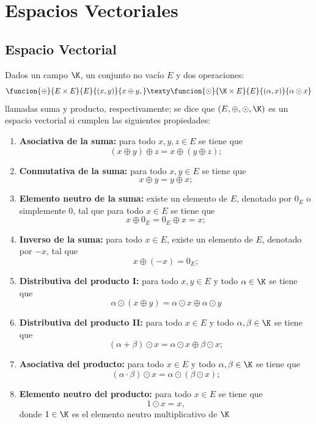 \documentclass[compacto,10pt]{pubciencias-notas}
\begin{document}
\encabezado

\section{Espacios Vectoriales}
\subsection{Espacio Vectorial}

\begin{defi}
    Dados un campo $\K$, un conjunto no vacío $E$ y dos operaciones:
    \[
        \funcion{\oplus}{E\times E}{E}{(x,y)}{x\oplus y,}
        \texty
        \funcion{\odot}{\K\times E}{E}{(\alpha,x)}{\alpha\odot x}
    \]
    llamadas suma y producto, respectivamente; se dice que $(E,\oplus,\odot,\K)$ es un espacio vectorial si cumplen las siguientes propiedades:
    \begin{enumerate}
    \item \textbf{Asociativa de la suma:}
        para todo $x,y,z\in E$ se tiene que
        \[
            (x \oplus y) \oplus z = x \oplus (y \oplus z);
        \]
    \item \textbf{Conmutativa de la suma:}
        para todo $x,y\in E$ se tiene que
        \[
            x \oplus y = y \oplus x;
        \]
    \item \textbf{Elemento neutro de la suma:}
        existe un elemento de $E$, denotado por $0_E$ o simplemente $0$, tal que para todo $x\in E$ se tiene que 
        \[
            x \oplus 0_E = 0_E \oplus x = x;
        \]
    \item \textbf{Inverso de la suma:}
        para todo $x\in E$, existe un elemento de $E$, denotado por $-x$, tal que
        \[
            x \oplus (-x)= 0_E;
        \]
    \item \textbf{Distributiva del producto I:}
        para todo $x,y\in E$ y todo $\alpha\in \K$ se tiene que
        \[
            \alpha\odot (x \oplus y)=\alpha\odot x \oplus \alpha\odot y
        \]
        
    \item \textbf{Distributiva del producto II:}
        para todo $x\in E$ y todo $\alpha,\beta\in \K$ se tiene que
        \[
            (\alpha+\beta)\odot x=\alpha\odot x \oplus \beta\odot x;
        \]
    \item \textbf{Asociativa del producto:}
        para todo $x\in E$ y todo $\alpha,\beta\in \K$ se tiene que
        \[
            (\alpha\cdot \beta)\odot x=\alpha\odot(\beta\odot x);
        \]
    \item \textbf{Elemento neutro del producto:}
        para todo $x\in E$ se tiene que
        \[
            1\odot x=x,
        \]
        donde $1\in\K$ es el elemento neutro multiplicativo de $\K$
    \end{enumerate}
\end{defi}
\end{document}
